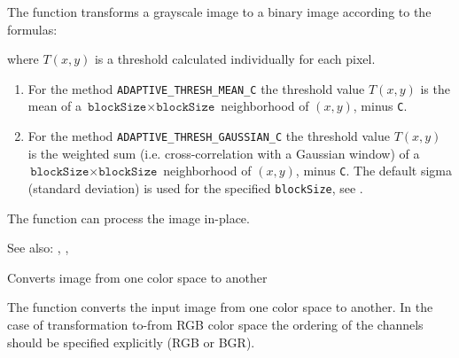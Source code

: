 The function transforms a grayscale image to a binary image according to the formulas:

\begin{description}
\end{description}

where $T(x,y)$ is a threshold calculated individually for each pixel.

\begin{enumerate}
    \item
For the method \texttt{ADAPTIVE\_THRESH\_MEAN\_C} the threshold value $T(x,y)$ is the mean of a $\texttt{blockSize} \times \texttt{blockSize}$ neighborhood of $(x, y)$, minus \texttt{C}.
    \item
For the method \texttt{ADAPTIVE\_THRESH\_GAUSSIAN\_C} the threshold value $T(x, y)$ is the weighted sum (i.e. cross-correlation with a Gaussian window) of a $\texttt{blockSize} \times \texttt{blockSize}$ neighborhood of $(x, y)$, minus \texttt{C}. The default sigma (standard deviation) is used for the specified \texttt{blockSize}, see .
\end{enumerate}

The function can process the image in-place.

See also: , , 


Converts image from one color space to another

\begin{description}
\end{description}

The function converts the input image from one color
space to another. In the case of transformation to-from RGB color space the ordering of the channels should be specified explicitly (RGB or BGR).


